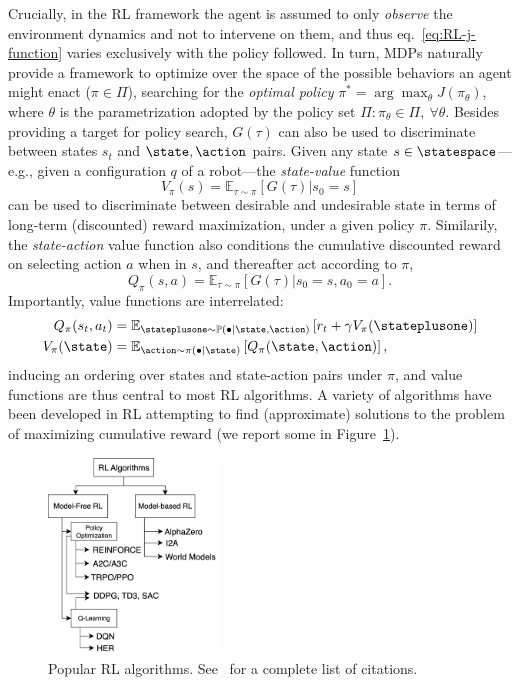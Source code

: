 Crucially, in the RL framework the agent is assumed to only \emph{observe} the environment dynamics and not to intervene on them, and thus eq.~\ref{eq:RL-j-function} varies exclusively with the policy followed.
In turn, MDPs naturally provide a framework to optimize over the space of the possible behaviors an agent might enact (\( \pi \in \Pi \)), searching for the \emph{optimal policy} \( \pi^* = \arg \max_{\theta} J(\pi_\theta) \), where \( \theta \) is the parametrization adopted by the policy set \( \Pi: \pi_\theta \in \Pi, \ \forall \theta \).
Besides providing a target for policy search, \( G(\tau) \) can also be used to discriminate between states \( s_t \) and \(\state, \action\) pairs.
Given any state \( s \in \statespace \)---e.g., given a configuration \( q \) of a robot---the \emph{state-value} function
\[
    V_\pi(s) = \mathbb E_{\tau \sim \pi} \left[ G(\tau) \big \vert s_0 = s \right]
\]
can be used to discriminate between desirable and undesirable state in terms of long-term (discounted) reward maximization, under a given policy \(\pi\).
Similarily, the \emph{state-action} value function also conditions the cumulative discounted reward on selecting action \( a \) when in \( s \), and thereafter act according to \( \pi \),
\[
    Q_\pi(s,a) = \mathbb E_{\tau \sim \pi} \left[ G (\tau) \big \vert s_0 = s, a_0=a \right].
\]
Importantly, value functions are interrelated:
\begin{align}
Q_\pi(s_t, a_t) &= \mathbb{E}_{\stateplusone \sim \mathbb P(\bullet \vert \state, \action)} \left[ r_t + \gamma V_\pi(\stateplusone) \right] \label{eq:q-as-v} \\
V_\pi(\state) &= \mathbb E_{\action \sim \pi(\bullet \vert \state)} \left[ Q_\pi (\state, \action) \right],
\label{eq:v-as-q}
\end{align}
inducing an ordering over states and state-action pairs under \( \pi \), and value functions are thus central to most RL algorithms.
A variety of algorithms have been developed in RL attempting to find (approximate) solutions to the problem of maximizing cumulative reward (we report some in Figure~\ref{fig:rl-algos-atlas}).

\begin{figure}
    \centering
    \includegraphics[width=0.4\textwidth]{figures/ch3/ch3-rl-algorithms-atlas.png}
    \caption{Popular RL algorithms. See~\citet{SpinningUp2018} for a complete list of citations.}
    \label{fig:rl-algos-atlas}
\end{figure}


